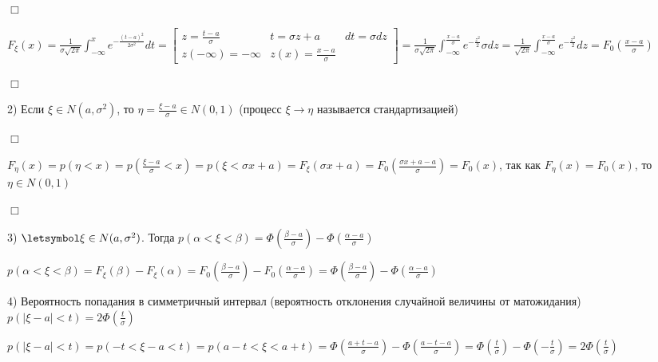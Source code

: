 \documentclass[12pt]{article}
\begin{document}
    \begin{MyProof}
        $\Box$
        
        $F_\xi(x) = \frac{1}{\sigma\sqrt{2\pi}} \int_{-\infty}^x e^{-\frac{(t - a)^2}{2\sigma^2}} dt = \left[\begin{matrix}z = \frac{t - a}{\sigma} & t = \sigma z + a & dt = \sigma dz \\ z (-\infty) = -\infty & z(x) = \frac{x - a}{\sigma} & \end{matrix}\right] = 
        \frac{1}{\sigma\sqrt{2\pi}} \int_{-\infty}^\frac{x - a}{\sigma} e^{-\frac{z^2}{2}} \sigma dz = \frac{1}{\sqrt{2\pi}} \int_{-\infty}^\frac{x - a}{\sigma} e^{-\frac{z^2}{2}} dz = F_0\left(\frac{x - a}{\sigma}\right)$
        
        $\Box$
    \end{MyProof}

    2) Если $\xi \in N(a, \sigma^2)$, то $\eta = \frac{\xi - a}{\sigma} \in N(0, 1)$ (процесс $\xi \to \eta$ называется стандартизацией)

    \begin{MyProof}
        $\Box$
        
        $F_\eta(x) = p(\eta < x) = p\left(\frac{\xi - a}{\sigma} < x\right) = p(\xi < \sigma x + a) = F_\xi(\sigma x + a) = F_0\left(\frac{\sigma x + a - a}{\sigma}\right) = F_0(x)$, так как $F_\eta(x) = F_0(x)$, то $\eta \in N(0, 1)$
        
        $\Box$
    \end{MyProof}

    3) $\letsymbol \xi \in N(a, \sigma^2)$. Тогда $p(\alpha < \xi < \beta) = \Phi\left(\frac{\beta - a}{\sigma}\right) - \Phi\left(\frac{\alpha - a}{\sigma}\right)$

    \begin{MyProof}
        $p(\alpha < \xi < \beta) = F_\xi(\beta) - F_\xi(\alpha) = F_0\left(\frac{\beta - a}{\sigma}\right) - F_0\left(\frac{\alpha - a}{\sigma}\right) = \Phi\left(\frac{\beta - a}{\sigma}\right) - \Phi\left(\frac{\alpha - a}{\sigma}\right)$
    \end{MyProof}

    4) Вероятность попадания в симметричный интервал (вероятность отклонения случайной величины от матожидания) 
    $p(|\xi - a| < t) = 2\Phi\left(\frac{t}{\sigma}\right)$

    \begin{MyProof}
        $p(|\xi - a| < t) = p(-t < \xi - a < t) = p(a - t < \xi < a + t) = \Phi\left(\frac{a + t - a}{\sigma}\right) - \Phi\left(\frac{a - t - a}{\sigma}\right) = \Phi\left(\frac{t}{\sigma}\right) - \Phi\left(-\frac{t}{\sigma}\right) = 2\Phi\left(\frac{t}{\sigma}\right)$
    \end{MyProof}
\end{document}

